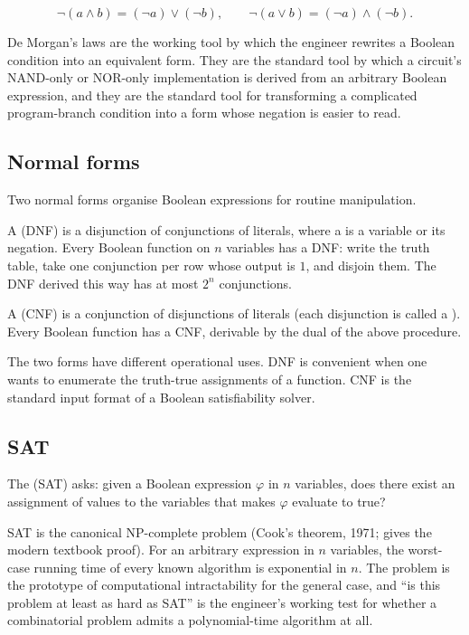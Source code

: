 \begin{principle}
\[
\lnot(a \land b) = (\lnot a) \lor (\lnot b),
\qquad
\lnot(a \lor b) = (\lnot a) \land (\lnot b).
\]
\end{principle}

De Morgan's laws are the working tool by which the engineer rewrites
a Boolean condition into an equivalent form. They are the
standard tool by which a circuit's NAND-only or NOR-only
implementation is derived from an arbitrary Boolean expression,
and they are the standard tool for transforming a complicated
program-branch condition into a form whose negation is easier to
read.

\subsection{Normal forms}

Two normal forms organise Boolean expressions for routine
manipulation.

A  (DNF) is a disjunction of
conjunctions of literals, where a  is a variable
or its negation. Every Boolean function on $n$ variables has a DNF:
write the truth table, take one conjunction per row whose output is
$1$, and disjoin them. The DNF derived this way has at most $2^{n}$
conjunctions.

A  (CNF) is a conjunction of
disjunctions of literals (each disjunction is called a
). Every Boolean function has a CNF, derivable by
the dual of the above procedure.

The two forms have different operational uses. DNF is convenient
when one wants to enumerate the truth-true assignments of a
function. CNF is the standard input format of a Boolean
satisfiability solver.

\subsection{SAT}

The  (SAT) asks: given a
Boolean expression $\varphi$ in $n$ variables, does there exist an
assignment of values to the variables that makes $\varphi$
evaluate to true?

SAT is the canonical NP-complete problem (Cook's theorem, 1971;
\cite{text:sipser} gives the modern textbook proof). For an
arbitrary expression in $n$ variables, the worst-case running time
of every known algorithm is exponential in $n$. The problem is the
prototype of computational intractability for the general case,
and ``is this problem at least as hard as SAT'' is the engineer's
working test for whether a combinatorial problem admits a
polynomial-time algorithm at all.

